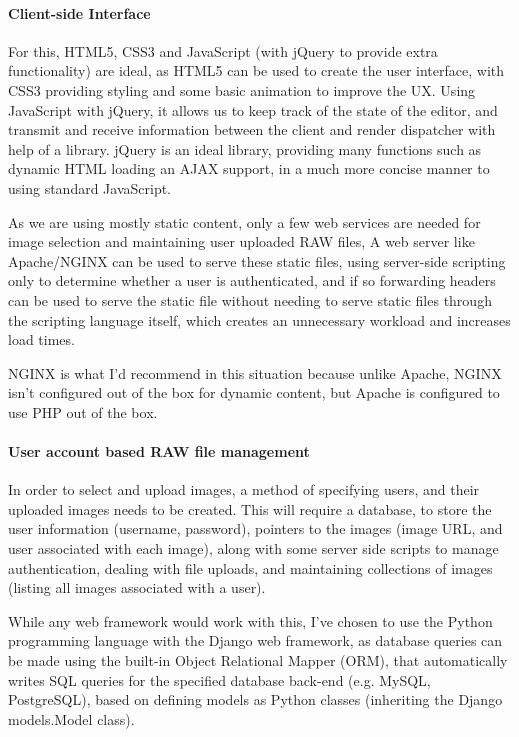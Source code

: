 \documentclass[12pt,a4paper]{article}
\begin{document}
\paragraph{Client-side Interface}
For this, HTML5, CSS3 and JavaScript (with jQuery to provide extra functionality)
are ideal, as HTML5 can be used to create the user interface, with CSS3 providing styling
and some basic animation to improve the UX. Using JavaScript with jQuery, it allows us to keep track of the state of the editor, and transmit and receive information between the client and render dispatcher with help of a library. jQuery is an ideal library, providing many functions such as dynamic HTML loading an AJAX support, in a much more concise manner to using standard JavaScript.

As we are using mostly static content, only a few web services are needed for image selection and maintaining user uploaded RAW files, A web server like Apache/NGINX can be used to serve
these static files, using server-side scripting only to determine whether a user is authenticated,
and if so forwarding headers can be used to serve the static file without needing to serve static files
through the scripting language itself, which creates an unnecessary workload and increases load times.

NGINX is what I'd recommend in this situation because unlike Apache, NGINX isn't
configured out of the box for dynamic content, but Apache is configured to use PHP
out of the box.

\paragraph{User account based RAW file management}
In order to select and upload images, a method of specifying users, and their uploaded images needs to be created. This will require a database, to store the user information (username, password), pointers to the images (image URL, and user associated with each image), along with some server side scripts to manage authentication, dealing with file uploads, and maintaining collections
of images (listing all images associated with a user).

While any web framework would work with this, I've chosen to use the Python programming language with the Django web framework, as database queries can be made using the built-in
Object Relational Mapper (ORM), that automatically writes SQL queries for the specified database back-end (e.g. MySQL, PostgreSQL), based on defining models as Python classes (inheriting
the Django models.Model class).
\end{document}

